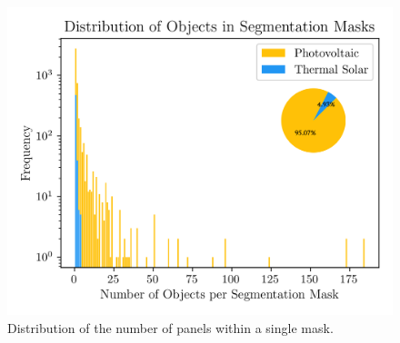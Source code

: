 \documentclass[conference]{IEEEtran}
\begin{document}
\begin{figure}[H]
    \centering
    \includegraphics[width=1\linewidth]{assets/data_objectdistribution_ph.png}
    \caption{Distribution of the number of panels within a single mask.}
    \label{fig:data_objectdistribution}
\end{figure}
\end{document}
